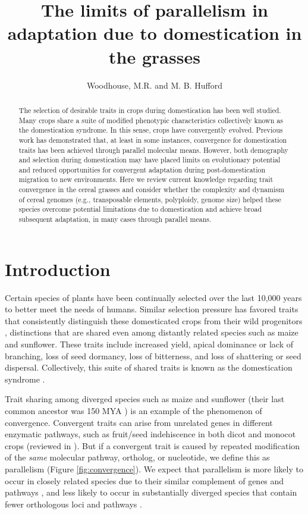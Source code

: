 \documentclass[12pt]{article}
\title{The limits of parallelism in adaptation due to domestication in the grasses}
\author{Woodhouse, M.R. and M. B. Hufford}
\begin{document}
\maketitle

\begin{abstract}
The selection of desirable traits in crops during domestication has been well studied.
Many crops share a suite of modified phenotypic characteristics collectively known as the domestication syndrome.
In this sense, crops have convergently evolved.
Previous work has demonstrated that, at least in some instances, convergence for domestication traits has been achieved through parallel molecular means.
However, both demography and selection during domestication may have placed limits on evolutionary potential and reduced opportunities for convergent adaptation during post-domestication migration to new environments.
Here we review current knowledge regarding trait convergence in the cereal grasses and consider whether the complexity and dynamism of cereal genomes (e.g., transposable elements, polyploidy, genome size) helped these species overcome potential limitations due to domestication and achieve broad subsequent adaptation, in many cases through parallel means.
\end{abstract}

\section*{Introduction}
Certain species of plants have been continually selected over the last 10,000 years to better meet the needs of humans.
Similar selection pressure has favored traits that consistently distinguish these domesticated crops from their wild progenitors \citep{Doebley2006}, distinctions that are shared even among distantly related species such as maize and sunflower.
These traits include increased yield, apical dominance or lack of branching, loss of seed dormancy, loss of bitterness, and loss of shattering or seed dispersal.
Collectively, this suite of shared traits is known as the domestication syndrome \citep{Hammer1984}.

Trait sharing among diverged species such as maize and sunflower (their last common ancestor was 150 MYA \citep{Chang2004}) is an example of the phenomenon of convergence. 
Convergent traits can arise from unrelated genes in different enzymatic pathways, such as fruit/seed indehiscence in both dicot and monocot crops (reviewed in \citep{Dong2015}).
But if a convergent trait is caused by repeated modification of the \emph{same} molecular pathway, ortholog, or nucleotide, we define this as parallelism \citep{Rosenblum2014} (Figure \ref{fig:convergence}). 
We expect that parallelism is more likely to occur in closely related species due to their similar complement of genes and pathways \citep{Pickersgill2018}, and less likely to occur in substantially diverged species that contain fewer orthologous loci and pathways \citep{Washburn2016, Pickersgill2018}.
\end{document}
